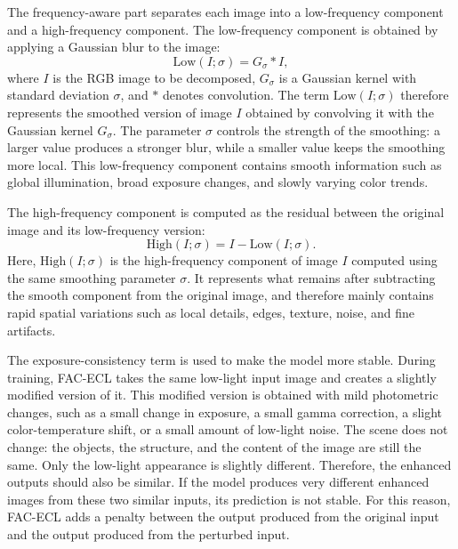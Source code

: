 The frequency-aware part separates each image into a low-frequency component and a high-frequency component. The low-frequency component is obtained by applying a Gaussian blur to the image:
\begin{equation}
	\mathrm{Low}(I;\sigma)
	=
	G_{\sigma} \ast I,
	\label{eq:fac_ecl_low_frequency}
\end{equation}
where $I$ is the RGB image to be decomposed, $G_{\sigma}$ is a Gaussian kernel with standard deviation $\sigma$, and $\ast$ denotes convolution. The term $\mathrm{Low}(I;\sigma)$ therefore represents the smoothed version of image $I$ obtained by convolving it with the Gaussian kernel $G_{\sigma}$. The parameter $\sigma$ controls the strength of the smoothing: a larger value produces a stronger blur, while a smaller value keeps the smoothing more local. This low-frequency component contains smooth information such as global illumination, broad exposure changes, and slowly varying color trends.

The high-frequency component is computed as the residual between the original image and its low-frequency version:
\begin{equation}
	\mathrm{High}(I;\sigma)
	=
	I - \mathrm{Low}(I;\sigma).
	\label{eq:fac_ecl_high_frequency}
\end{equation}
Here, $\mathrm{High}(I;\sigma)$ is the high-frequency component of image $I$ computed using the same smoothing parameter $\sigma$. It represents what remains after subtracting the smooth component from the original image, and therefore mainly contains rapid spatial variations such as local details, edges, texture, noise, and fine artifacts.

The exposure-consistency term is used to make the model more stable. During training, FAC-ECL takes the same low-light input image and creates a slightly modified version of it. This modified version is obtained with mild photometric changes, such as a small change in exposure, a small gamma correction, a slight color-temperature shift, or a small amount of low-light noise. The scene does not change: the objects, the structure, and the content of the image are still the same. Only the low-light appearance is slightly different. Therefore, the enhanced outputs should also be similar. If the model produces very different enhanced images from these two similar inputs, its prediction is not stable. For this reason, FAC-ECL adds a penalty between the output produced from the original input and the output produced from the perturbed input.

